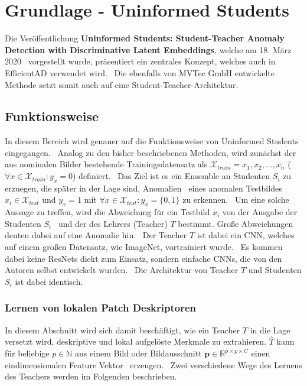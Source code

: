 \section{Grundlage - Uninformed Students}\label{sec:GrundlageUninformedStudents}
Die Veröffentlichung \textbf{Uninformed Students: Student-Teacher Anomaly Detection with Discriminative Latent Embeddings}, welche am 18. März 2020 \
vorgestellt wurde, präsentiert ein zentrales Konzept, welches auch in EfficientAD verwendet wird. \
Die ebenfalls von MVTec GmbH entwickelte Methode setzt somit auch auf eine Student-Teacher-Architektur. \
\subsection{Funktionsweise}
In diesem Bereich wird genauer auf die Funktionsweise von \glqq Uninformed Students\grqq{} eingegangen. \
Analog zu den bisher beschriebenen Methoden, wird zunächst der aus nominalen Bilder bestehende Trainingsdatensatz als
$\mathcal{X}_{train}={x_1, x_2, ..., x_n}$ ($\forall x \in \mathcal{X}_{train}: y_{x}=0$) definiert. \
Das Ziel ist es ein Ensemble an \glqq Studenten\grqq{} $S_{i}$ zu erzuegen, die später in der Lage sind, Anomalien \
eines anomalen Testbildes $x_{i}\in\mathcal{X}_{test}$ und $y_{x} = 1$ mit $\forall x \in \mathcal{X}_{test}: y_{x}=\{0,1\}$ zu erkennen. \
Um eine solche Aussage zu treffen, wird die Abweichung für ein Testbild $x_{i}$ von der Ausgabe der Studenten $S_{i}$ \
und der des \glqq Lehrers\grqq{} (Teacher) $T$ bestimmt. Große Abweichungen deuten dabei auf eine Anomalie hin. \
Der Teacher $T$ ist dabei ein CNN, welches auf einem großen Datensatz, wie ImageNet, vortrainiert wurde. \
Es kommen dabei keine ResNets diekt zum Einsatz, sondern einfache CNNs, die von den Autoren selbst entwickelt wurden. \
Die Architektur von Teacher $T$ und Studenten $S_{i}$ ist dabei identisch. \
\subsubsection*{Lernen von lokalen Patch Deskriptoren}
In diesem Abschnitt wird sich damit beschäftigt, wie ein Teacher $T$ in die Lage versetzt wird,
deskriptive und lokal aufgelöste Merkmale zu extrahieren. %
$\hat{T}$ kann für beliebige $p\in\mathbb{N}$ aus einem Bild oder Bildausschnitt $\mathbf{p}\in\mathbb{R}^{p\times p\times C}$ einen eindimensionalen Feature Vektor \
erzeugen. \ 
Zwei verschiedene Wege des Lernens des Teachers werden im Folgenden beschrieben. \
